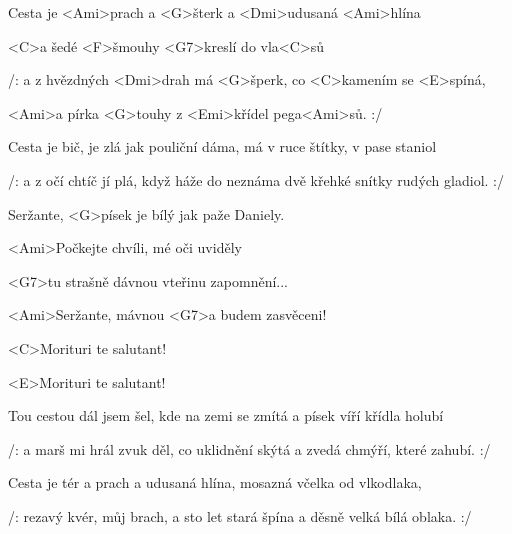 

\zs
Cesta je <Ami>prach a <G>šterk a <Dmi>udusaná <Ami>hlína

<C>a šedé <F>šmouhy <G7>kreslí do vla<C>sů

/: a z hvězdných <Dmi>drah má <G>šperk, co <C>kamením se <E>spíná,

<Ami>a pírka <G>touhy z <Emi>křídel pega<Ami>sů. :/
\ks

\zs
Cesta je bič, je zlá jak pouliční dáma,
má v ruce štítky, v pase staniol

/: a z očí chtíč jí plá, když háže do neznáma
dvě křehké snítky rudých gladiol. :/
\ks

\zr
Seržante, <G>písek je bílý jak paže Daniely.

<Ami>Počkejte chvíli, mé oči uviděly

<G7>tu strašně dávnou vteřinu zapomnění...

<Ami>Seržante, mávnou <G7>a budem zasvěceni!

<C>Morituri te salutant!

<E>Morituri te salutant!
\kr

\zr
Tou cestou dál jsem šel, kde na zemi se zmítá
a písek víří křídla holubí

/: a marš mi hrál zvuk děl,
co uklidnění skýtá a zvedá chmýří, které zahubí. :/
\kr

\zr
Cesta je tér a prach a udusaná hlína,
mosazná včelka od vlkodlaka,

/: rezavý kvér, můj brach, a sto let stará špína
a děsně velká bílá oblaka. :/
\kr

\zr \kr

\kp
